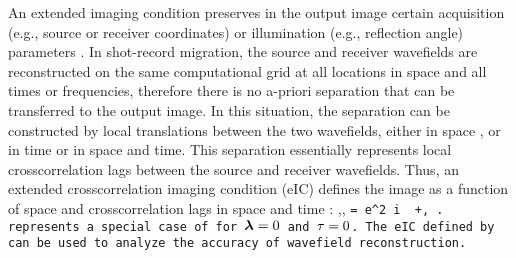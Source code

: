 An extended imaging condition preserves in the output image certain acquisition (e.g., source or receiver coordinates) or illumination (e.g., reflection angle) parameters \cite[]{GEO46-11-15591567,Claerbout.iei,GEO50-12-24582472,TLE18-08-09500952}. In shot-record migration, the source and receiver wavefields are reconstructed on the same computational grid at all locations in space and all times or frequencies, therefore there is no a-priori separation that can be transferred to the output image. In this situation, the separation can be constructed by local translations between the two wavefields, either in space \cite[]{RickettSava.geo.img,SavaFomel.segab2.2005}, or in time \cite[]{SavaFomel.geo.tsic} or in space and time. This separation essentially represents local crosscorrelation lags between the source and receiver wavefields. Thus, an extended crosscorrelation imaging condition (eIC) defines the image as a function of space and crosscorrelation lags in space \geouline{$\hh$} and time \geouline{$\tt$}:
%
\beq
\label{eqn:EICw}
\RR \lp \xx,\hh,   \tt \rp =  \esum{\ww} e^{2 i \ww \tt}
\CONJ{ \USw \lp \xx-\hh, \ww \rp }
       \URw \lp \xx+\hh, \ww \rp \;.
\eeq
%
 represents a special case of  for $\hh=0$ and $\tt=0$.  The eIC defined by  can be used to analyze the accuracy of wavefield reconstruction.

